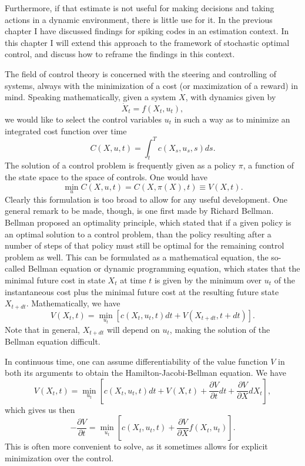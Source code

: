  Furthermore, if that estimate is not useful for making decisions and taking actions in a dynamic environment, there is little use for it. In the previous chapter I have discussed findings for spiking codes in an estimation context. In this chapter I will extend this approach to the framework of stochastic optimal control, and discuss how to reframe the findings in this context.\par

The field of control theory is concerned with the steering and controlling of systems, always with the minimization of a cost (or maximization of a reward) in mind. Speaking mathematically, given a system $X$, with dynamics given by
$$
\dot{X}_t = f(X_t,u_t),
$$
we would like to select the control variables $u_t$ in such a way as to minimize an integrated cost function over time
$$
C(X,u,t) = \int_{t}^T c(X_s,u_s,s) ds.
$$
The solution of a control problem is frequently given as a policy $\pi$, a function of the state space to the space of controls. One would have
$$
\min_u C(X,u,t) = C(X,\pi(X),t) \equiv V(X,t).
$$
Clearly this formulation is too broad to allow for any useful development. One general remark to be made, though, is one first made by Richard Bellman. Bellman\cite{Bellman1952} proposed an optimality principle, which stated that if a given policy is an optimal solution to a control problem, than the policy resulting after a number of steps of that policy must still be optimal for the remaining control problem as well. This can be formulated as a mathematical equation, the so-called Bellman equation or dynamic programming equation, which states that the minimal future cost in state $X_t$ at time $t$ is given by the minimum over $u_t$ of the instantaneous cost plus the minimal future cost at the resulting future state $X_{t+dt}$. Mathematically, we have
$$
V(X_t,t) = \min_{u_t} \left[ c(X_t,u_t,t) dt +V(X_{t+dt},t+dt)\right].
$$
Note that in general, $X_{t+dt}$ will depend on $u_t$, making the solution of the Bellman equation difficult.\par
In continuous time, one can assume differentiability of the value function $V$ in both its arguments to obtain the Hamilton-Jacobi-Bellman equation. We have
$$
V(X_t,t) = \min_{u_t} \left[c(X_t,u_t,t) dt + V(X,t) + \frac{\partial V}{\partial t} dt + \frac{\partial V}{\partial X} dX_t \right],
$$
which gives us then
$$
-\frac{\partial V}{\partial t} = \min_{u_t} \left[c(X_t,u_t,t) + \frac{\partial V}{\partial X} f(X_t,u_t) \right].
$$
This is often more convenient to solve, as it sometimes allows for explicit minimization over the control.

